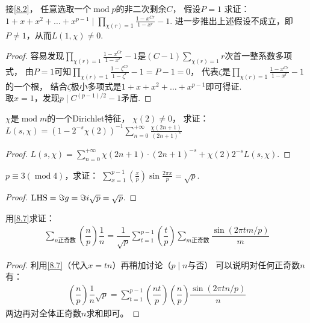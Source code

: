 \begin{exercise}\label{8.5}
    接\ref{8.2}，
    任意选取一个$\operatorname{mod}p$的非二次剩余$C$，
    假设$P=1$
    求证：$1+x+x^2+\ldots+x^{p-1}\mid\prod_{\chi(r)=1}\frac{1-x^{Cr}}{1-x^r}-1$.
    进一步推出上述假设不成立，即$P\neq1$，从而$L(1,\chi)\neq0$.
\end{exercise}
\begin{proof}
    容易发现$\prod_{\chi(r)=1}\frac{1-x^{Cr}}{1-x^r}-1$是$(C-1)\sum_{\chi(r)=1}r$次首一整系数多项式，
    由$P=1$可知$\prod_{\chi(r)=1}\frac{1-\zeta^{Cr}}{1-\zeta^r}-1=P-1=0$，
    代表$\zeta$是$\prod_{\chi(r)=1}\frac{1-x^{Cr}}{1-x^r}-1$的一个根，
    结合$\zeta$极小多项式是$1+x+x^2+\ldots+x^{p-1}$即可得证.\\
    取$x=1$，发现$p\mid C^{(p-1)/2}-1$矛盾.
\end{proof}

\begin{exercise}\label{8.6}
    $\chi$是$\operatorname{mod}m$的一个Dirichlet特征，
    $\chi(2)\neq0$，
    求证：$\displaystyle L(s,\chi)=(1-2^{-s}\chi(2))^{-1}\sum_{n=0}^{+\infty}\frac{\chi(2n+1)}{(2n+1)^s}$
\end{exercise}
\begin{proof}
    $\displaystyle L(s,\chi)=\sum_{n=0}^{+\infty}\chi(2n+1)\cdot(2n+1)^{-s}+\chi(2)2^{-s}L(s,\chi)$.
\end{proof}

\begin{exercise}\label{8.7}
    $p\equiv3(\operatorname{mod}4)$，求证：
    $\sum_{x=1}^{p-1}\left( \frac{x}{p} \right)\sin\frac{2\pi x}{p}=\sqrt{p}$.
\end{exercise}
\begin{proof}
    $\operatorname{LHS}=\Im g=\Im i\sqrt{p}=\sqrt{p}$.
\end{proof}

\begin{exercise}\label{8.8}
    用\ref{8.7}求证：
    \begin{align*}
        \sum_{n正奇数}\left( \dfrac{n}{p} \right)\dfrac{1}{n}=
    \dfrac{1}{\sqrt{p}}\sum_{t=1}^{p-1}\left(\dfrac{t}{p}\right)\sum_{m正奇数}\dfrac{\sin(2\pi tm/p)}{m}
    \end{align*}
\end{exercise}
\begin{proof}
    利用\ref{8.7}（代入$x=tn$）再稍加讨论（$p\mid n$与否）
    可以说明对任何正奇数$n$有：
    \begin{align*}
        \left( \dfrac{n}{p} \right)\dfrac{1}{n}\sqrt{p}
        =
        \sum_{t=1}^{p-1}\left(\dfrac{nt}{p}\right)\left(\dfrac{n}{p}\right)\dfrac{\sin(2\pi tn/p)}{n}
    \end{align*}
    两边再对全体正奇数$n$求和即可。
\end{proof}

